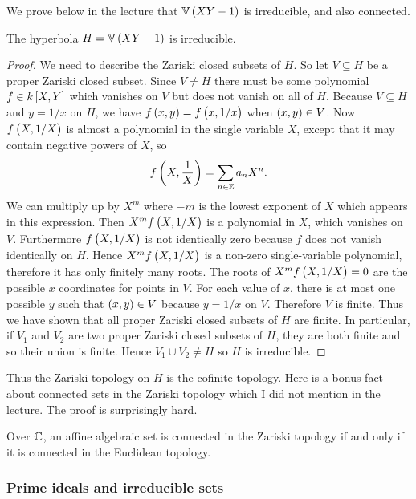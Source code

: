 We prove below in the lecture that $ \VV\br{XY - 1} $ is irreducible, and also connected.

\begin{lemma}
The hyperbola $ H = \VV\br{XY - 1} $ is irreducible.
\end{lemma}

\begin{proof}
We need to describe the Zariski closed subsets of $ H $. So let $ V \subseteq H $ be a proper Zariski closed subset. Since $ V \ne H $ there must be some polynomial $ f \in k\sbr{X, Y} $ which vanishes on $ V $ but does not vanish on all of $ H $. Because $ V \subseteq H $ and $ y = 1 / x $ on $ H $, we have $ f\br{x, y} = f\br{x, 1 / x} $ when $ \br{x, y} \in V $. Now $ f\br{X, 1 / X} $ is almost a polynomial in the single variable $ X $, except that it may contain negative powers of $ X $, so
$$ f\br{X, \dfrac{1}{X}} = \sum_{n \in \ZZ} a_nX^n. $$
We can multiply up by $ X^m $ where $ -m $ is the lowest exponent of $ X $ which appears in this expression. Then $ X^mf\br{X, 1 / X} $ is a polynomial in $ X $, which vanishes on $ V $. Furthermore $ f\br{X, 1 / X} $ is not identically zero because $ f $ does not vanish identically on $ H $. Hence $ X^mf\br{X, 1 / X} $ is a non-zero single-variable polynomial, therefore it has only finitely many roots. The roots of $ X^mf\br{X, 1 / X} = 0 $ are the possible $ x $ coordinates for points in $ V $. For each value of $ x $, there is at most one possible $ y $ such that $ \br{x, y} \in V $ because $ y = 1 / x $ on $ V $. Therefore $ V $ is finite. Thus we have shown that all proper Zariski closed subsets of $ H $ are finite. In particular, if $ V_1 $ and $ V_2 $ are two proper Zariski closed subsets of $ H $, they are both finite and so their union is finite. Hence $ V_1 \cup V_2 \ne H $ so $ H $ is irreducible.
\end{proof}

Thus the Zariski topology on $ H $ is the cofinite topology. Here is a bonus fact about connected sets in the Zariski topology which I did not mention in the lecture. The proof is surprisingly hard.

\begin{theorem}
Over $ \mathbb{C} $, an affine algebraic set is connected in the Zariski topology if and only if it is connected in the Euclidean topology.
\end{theorem}

\subsubsection{Prime ideals and irreducible sets}

